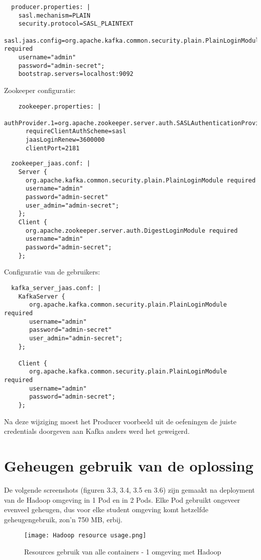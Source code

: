 \begin{lstlisting}
  producer.properties: |
    sasl.mechanism=PLAIN
    security.protocol=SASL_PLAINTEXT
    sasl.jaas.config=org.apache.kafka.common.security.plain.PlainLoginModule required
    username="admin"
    password="admin-secret";
    bootstrap.servers=localhost:9092
\end{lstlisting}

Zookeeper configuratie:
\begin{lstlisting}
    zookeeper.properties: |
      authProvider.1=org.apache.zookeeper.server.auth.SASLAuthenticationProvider
      requireClientAuthScheme=sasl
      jaasLoginRenew=3600000
      clientPort=2181
\end{lstlisting}
  
\begin{lstlisting}
  zookeeper_jaas.conf: |
    Server {
      org.apache.kafka.common.security.plain.PlainLoginModule required
      username="admin"
      password="admin-secret"
      user_admin="admin-secret";
    };
    Client {
      org.apache.zookeeper.server.auth.DigestLoginModule required
      username="admin"
      password="admin-secret";
    };
\end{lstlisting}

Configuratie van de gebruikers:
\begin{lstlisting}
  kafka_server_jaas.conf: |
    KafkaServer {
       org.apache.kafka.common.security.plain.PlainLoginModule required
       username="admin"
       password="admin-secret"
       user_admin="admin-secret";
    };

    Client {
       org.apache.kafka.common.security.plain.PlainLoginModule required
       username="admin"
       password="admin-secret";
    };
\end{lstlisting}

Na deze wijziging moest het Producer voorbeeld uit de oefeningen de juiste credentials doorgeven aan Kafka anders werd het geweigerd.

\section{Geheugen gebruik van de oplossing}
De volgende screenshots (figuren 3.3, 3.4, 3.5 en 3.6) zijn gemaakt na deployment van de Hadoop omgeving in 1 Pod en in 2 Pods. Elke Pod gebruikt ongeveer evenveel geheugen, dus voor elke student omgeving komt hetzelfde geheugengebruik, zon'n 750 MB, erbij.

\begin{figure}[H]
    \texttt{[image: Hadoop resource usage.png]}
    \caption{Resources gebruik van alle containers - 1 omgeving met Hadoop}
\end{figure}

